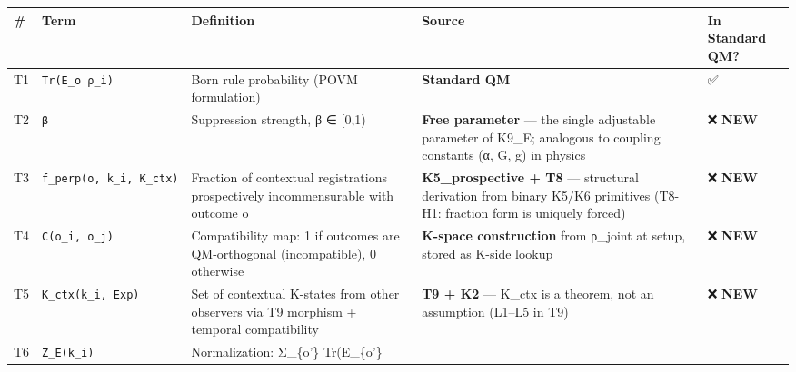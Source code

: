 \documentclass[
  11pt,
]{article}
\newcounter{none} %
\begin{document}
{\def\LTcaptype{none} %
\begin{longtable}[]{@{}
  >{\raggedright\arraybackslash}p{}
  >{\raggedright\arraybackslash}p{}
  >{\raggedright\arraybackslash}p{}
  >{\raggedright\arraybackslash}p{}
  >{\raggedright\arraybackslash}p{}@{}}
\toprule\noalign{}
\begin{minipage}[b]{\linewidth}\raggedright
\#
\end{minipage} & \begin{minipage}[b]{\linewidth}\raggedright
Term
\end{minipage} & \begin{minipage}[b]{\linewidth}\raggedright
Definition
\end{minipage} & \begin{minipage}[b]{\linewidth}\raggedright
Source
\end{minipage} & \begin{minipage}[b]{\linewidth}\raggedright
In Standard QM?
\end{minipage} \\
\midrule\noalign{}
\endhead
\bottomrule\noalign{}
\endlastfoot
T1 & \texttt{Tr(E\_o\ ρ\_i)} & Born rule probability (POVM formulation)
& \textbf{Standard QM} & ✅ \\
T2 & \texttt{β} & Suppression strength, β ∈ {[}0,1) & \textbf{Free
parameter} --- the single adjustable parameter of K9\_E; analogous to
coupling constants (α, G, g) in physics & ❌ \textbf{NEW} \\
T3 & \texttt{f\_perp(o,\ k\_i,\ K\_ctx)} & Fraction of contextual
registrations prospectively incommensurable with outcome o &
\textbf{K5\_prospective + T8} --- structural derivation from binary
K5/K6 primitives (T8-H1: fraction form is uniquely forced) & ❌
\textbf{NEW} \\
T4 & \texttt{C(o\_i,\ o\_j)} & Compatibility map: 1 if outcomes are
QM-orthogonal (incompatible), 0 otherwise & \textbf{K-space
construction} from ρ\_joint at setup, stored as K-side lookup & ❌
\textbf{NEW} \\
T5 & \texttt{K\_ctx(k\_i,\ Exp)} & Set of contextual K-states from other
observers via T9 morphism + temporal compatibility & \textbf{T9 + K2}
--- K\_ctx is a theorem, not an assumption (L1--L5 in T9) & ❌
\textbf{NEW} \\
T6 & \texttt{Z\_E(k\_i)} & Normalization: Σ\_\{o'\} Tr(E\_\{o'\}

\end{longtable}}
\end{document}
